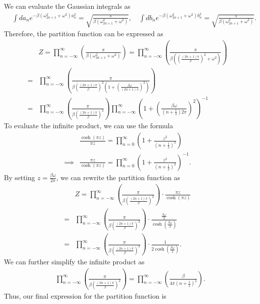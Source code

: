 We can evaluate the Gaussian integrals as
\begin{align}
    &\int da_n e^{-\beta\left( \omega_{2n+1}^2 + \omega^2 \right) a_n^2} = \sqrt{\frac{\pi}{\beta(\omega_{2n+1}^2 + \omega^2)}}, \quad \int db_n e^{-\beta\left( \omega_{2n+1}^2 + \omega^2 \right) b_n^2} = \sqrt{\frac{\pi}{\beta(\omega_{2n+1}^2 + \omega^2)}}.
\end{align} Therefore, the partition function can be expressed as
\begin{align}
    &Z = \prod_{n=-\infty}^{\infty} \left( \frac{\pi}{\beta(\omega_{2n+1}^2 + \omega^2)} \right) = \prod_{n=-\infty}^{\infty} \left( \frac{\pi}{\beta\left( \left( \frac{(2n+1)\pi}{\beta} \right)^2 + \omega^2 \right)} \right)\\
    =&\prod_{n=-\infty}^{\infty} \left( \frac{\pi}{\beta\left(\frac{(2n+1)\pi}{\beta}\right)^2\left(
    1+\left(\frac{\beta\omega}{(2n+1)\pi}\right)^2
    \right)}\right)\\
    =&\prod_{n=-\infty}^{\infty} \left( \frac{\pi}{\beta\left(\frac{(2n+1)\pi}{\beta}\right)^2} \right) \prod_{n=-\infty}^{\infty} \left( 1 + \left( \frac{\beta\omega}{(n+\frac{1}{2}) 2\pi} \right)^2 \right)^{-1}
\end{align}
To evaluate the infinite product, we can use the formula
\begin{align}
    &\frac{\cosh(\pi z)}{\pi z} = \prod_{n=0}^{\infty} \left( 1 + \frac{z^2}{(n+\frac{1}{2})^2} \right)\\
    \implies& \frac{\pi z}{\cosh(\pi z)} = \prod_{n=0}^{\infty} \left( 1 + \frac{z^2}{(n+\frac{1}{2})^2} \right)^{-1}.  
\end{align} By setting $z = \frac{\beta \omega}{2\pi}$, we can rewrite the partition function as
\begin{align}
    &Z=\prod_{n=-\infty}^{\infty} \left( \frac{\pi}{\beta\left(\frac{(2n+1)\pi}{\beta}\right)^2} \right) \cdot \frac{\pi z}{\cosh(\pi z)}\\
    =&\prod_{n=-\infty}^{\infty} \left( \frac{\pi}{\beta\left(\frac{(2n+1)\pi}{\beta}\right)^2} \right) \cdot \frac{\frac{\beta \omega}{2}}{\cosh\left( \frac{\beta \omega}{2} \right)}\\
    =&\prod_{n=-\infty}^{\infty} \left( \frac{\pi}{\beta\left(\frac{(2n+1)\pi}{\beta}\right)^2} \right) \cdot \frac{1}{2\cosh\left( \frac{\beta \omega}{2} \right)}.
\end{align}
We can further simplify the infinite product as
\begin{align}
    &\prod_{n=-\infty}^{\infty} \left( \frac{\pi}{\beta\left(\frac{(2n+1)\pi}{\beta}\right)^2} \right) = \prod_{n=-\infty}^{\infty} \left( \frac{\beta}{4\pi (n+\frac{1}{2})^2} \right).
\end{align} Thus, our final expression for the partition function is
